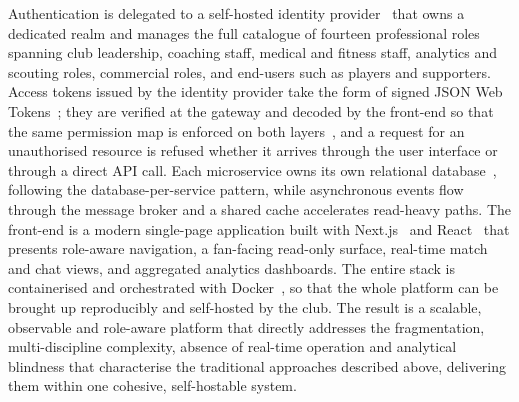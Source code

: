 Authentication is delegated to a self-hosted identity provider~\cite{keycloak} that owns a
dedicated realm and manages the full catalogue of fourteen professional roles spanning club
leadership, coaching staff, medical and fitness staff, analytics and scouting roles, commercial
roles, and end-users such as players and supporters. Access tokens issued by the identity
provider take the form of signed JSON Web Tokens~\cite{jwt}; they are verified at the
gateway and decoded by the front-end so that the same permission map is enforced on both
layers~\cite{rbac}, and a request for an unauthorised resource is refused whether it arrives
through the user interface or through a direct API call. Each microservice owns its own
relational database~\cite{postgres}, following the database-per-service pattern, while
asynchronous events flow through the message broker and a shared cache accelerates
read-heavy paths. The front-end is a modern single-page application built with
Next.js~\cite{nextjs} and React~\cite{react} that presents role-aware navigation, a
fan-facing read-only surface, real-time match and chat views, and aggregated analytics
dashboards. The entire stack is containerised and orchestrated with Docker~\cite{docker},
so that the whole platform can be brought up reproducibly and self-hosted by the club.
The result is a scalable, observable and role-aware platform that directly addresses the
fragmentation, multi-discipline complexity, absence of real-time operation and analytical
blindness that characterise the traditional approaches described above, delivering them
within one cohesive, self-hostable system.
